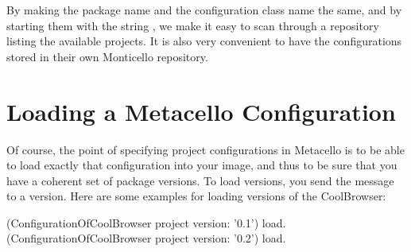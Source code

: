 \documentclass[a4paper,10pt,twoside]{book}
\begin{document}
By making the package name and the configuration class name the same, and by starting them with the string ,  we make it easy to scan through a repository listing the available projects. It is also very convenient to have the configurations stored in their own Monticello repository. 



\section{Loading a Metacello Configuration}
Of course, the point of specifying project configurations in Metacello is to be able to load exactly that configuration into your image, and thus to be sure that you have a coherent set of package versions. 
To load versions, you send the message  to a version. Here are some examples for loading versions of the CoolBrowser: 

\begin{code}{}
  (ConfigurationOfCoolBrowser project version: '0.1') load.
  (ConfigurationOfCoolBrowser project version: '0.2') load.
\end{code}
\end{document}
